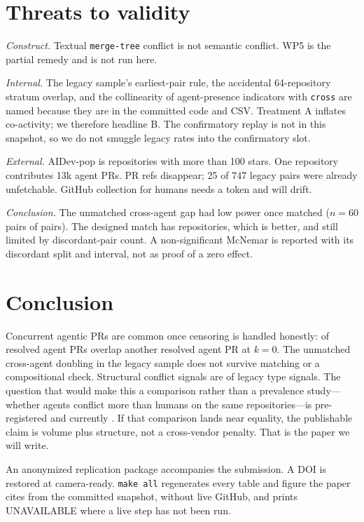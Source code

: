 \documentclass[10pt,conference]{IEEEtran}
\begin{document}
\section{Threats to validity}
\label{sec:threats}

\textit{Construct.} Textual \texttt{merge-tree} conflict is not semantic conflict. WP5 is the partial remedy and is not run here.

\textit{Internal.} The legacy sample's earliest-pair rule, the accidental 64-repository stratum overlap, and the collinearity of agent-presence indicators with \texttt{cross} are named because they are in the committed code and CSV. Treatment A inflates co-activity; we therefore headline B. The confirmatory replay is not in this snapshot, so we do not smuggle legacy rates into the confirmatory slot.

\textit{External.} AIDev-pop is repositories with more than 100 stars. One repository contributes 13k agent PRs. PR refs disappear; 25 of 747 legacy pairs were already unfetchable. GitHub collection for humans needs a token and will drift.

\textit{Conclusion.} The unmatched cross-agent gap had low power once matched ($n=60$ pairs of pairs). The designed match has \NReposMatched{} repositories, which is better, and still limited by discordant-pair count. A non-significant McNemar is reported with its discordant split and interval, not as proof of a zero effect.

\section{Conclusion}
\label{sec:conc}

Concurrent agentic PRs are common once censoring is handled honestly: \PrShareB{} of resolved agent PRs overlap another resolved agent PR at $k{=}0$. The unmatched cross-agent doubling in the legacy sample does not survive matching or a compositional check. Structural conflict signals are \LegacyStructural{} of legacy type signals. The question that would make this a comparison rather than a prevalence study---whether agents conflict more than humans on the same repositories---is pre-registered and currently \WPFourStatus. If that comparison lands near equality, the publishable claim is volume plus structure, not a cross-vendor penalty. That is the paper we will write.

An anonymized replication package accompanies the submission. A DOI is restored at camera-ready. \texttt{make all} regenerates every table and figure the paper cites from the committed snapshot, without live GitHub, and prints UNAVAILABLE where a live step has not been run.



\end{document}
